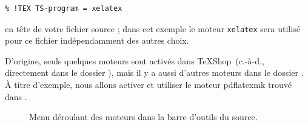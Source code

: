 \documentclass[11pt,french]{article}
\newcommand{\TS}{\textsf{\TeX Shop}}
\newcommand{\cmd}[1]{\textsf{#1}}
\newcommand{\mnu}[1]{\textsf{#1}}
\begin{document}
%
\begin{verbatim}
% !TEX TS-program = xelatex
\end{verbatim}
en tête de votre fichier source ; dans cet exemple le moteur \texttt{xelatex} sera utilisé pour ce fichier indépendamment des autres choix.

D'origine, seuls quelques moteurs sont activés dans \TS\ (c.-à-d., directement dans le dossier ), mais il y a aussi d'autres moteurs dans le dossier . À titre d'exemple, nous allons activer et utiliser le moteur \cmd{pdflatexmk} trouvé dans .

\begin{figure}
\centering
{}
\caption{Menu déroulant des moteurs dans la barre d'outils du source.\label{fig:EnginesPopup}}
\end{figure}
\end{document}
